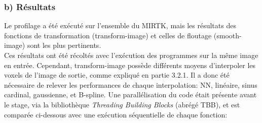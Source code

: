 \documentclass[10pt]{report}
\begin{document}
\subsubsection{b) Résultats}
Le profilage a été exécuté sur l'ensemble du MIRTK, mais les résultats des fonctions de transformation (transform-image) et celles de floutage (smooth-image) sont les plus pertinents. \\
Ces résultats ont été récoltés avec l'exécution des programmes sur la même image en entrée. Cependant, transform-image possède différents moyens d'interpoler les voxels de l'image de sortie, comme expliqué en partie 3.2.1. Il a donc été nécessaire de relever les performances de chaque interpolation: NN, linéaire, sinus cardinal, gaussienne, et B-spline. Une parallélisation du code était présente avant le stage, via la bibliothèque \textit{Threading Building Blocks} (abrégé TBB), et est comparée ci-dessous avec une exécution séquentielle de chaque fonction:
\end{document}
